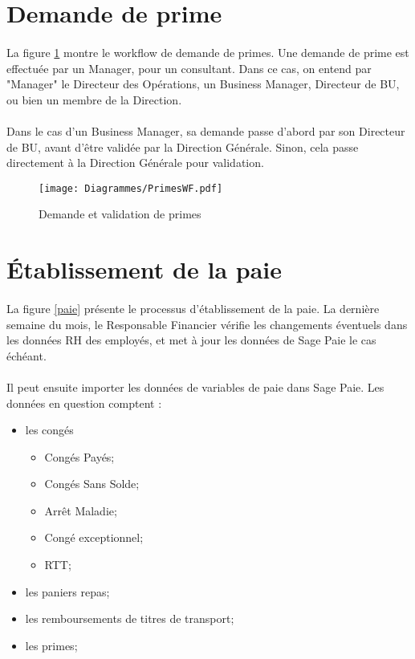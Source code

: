 \section{Demande de prime}
\paragraph{} La figure \ref{primes} montre le workflow de demande de primes. Une demande de prime est effectuée par un Manager, pour un consultant. Dans ce cas, on entend par "Manager" le Directeur des Opérations, un Business Manager, Directeur de BU, ou bien un membre de la Direction.
\paragraph{} Dans le cas d'un Business Manager, sa demande passe d'abord par son Directeur de BU, avant d'être validée par la Direction Générale. Sinon, cela passe directement à la Direction Générale pour validation.



\begin{figure}[H]
	\centering
	\texttt{[image: Diagrammes/PrimesWF.pdf]}
	\caption{Demande et validation de primes} 
	\label{primes}
\end{figure}

\section{Établissement de la paie}

\paragraph{} La figure \ref{paie} présente le processus d'établissement de la paie. La dernière semaine du mois, le Responsable Financier vérifie les changements éventuels dans les données RH des employés, et met à jour les données de Sage Paie le cas échéant.
\paragraph{} Il peut ensuite importer les données de variables de paie dans Sage Paie. Les données en question comptent : \begin{itemize}
	\item les congés \begin{itemize}
		\item Congés Payés;
		\item Congés Sans Solde;
		\item Arrêt Maladie;
		\item Congé exceptionnel;
		\item RTT;
	\end{itemize}
	\item les paniers repas;
	\item les remboursements de titres de transport;
	\item les primes;
\end{itemize}
